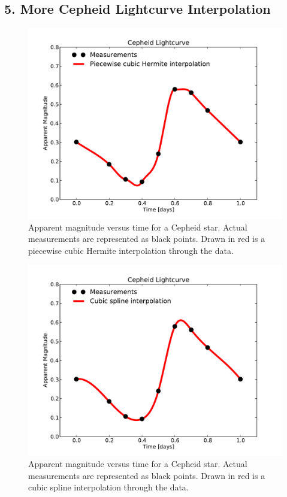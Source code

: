 \documentclass{article}
\begin{document}
\begin{spacing}{1.1}
\subsection{5. More Cepheid Lightcurve Interpolation}

\begin{figure}[H]
 \label{fig5-1}
 \includegraphics[width=\textwidth]{problem5_fig1.pdf}
 \caption{Apparent magnitude versus time for a Cepheid star. Actual measurements are represented as black points. Drawn in red is a piecewise cubic Hermite interpolation through the data.}
\end{figure} 

\begin{figure}[H]
 \label{fig5-2}
 \includegraphics[width=\textwidth]{problem5_fig2.pdf}
 \caption{Apparent magnitude versus time for a Cepheid star. Actual measurements are represented as black points. Drawn in red is a cubic spline interpolation through the data.}
\end{figure} 


\end{spacing}
\end{document}
